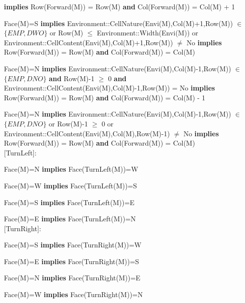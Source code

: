 \documentclass[11pt]{article}
\begin{document}
\textbf{implies} Row(Forward(M)) = Row(M) \textbf{and} Col(Forward(M)) = Col(M) + 1

Face(M)=S \textbf{implies}
Environment::CellNature(Envi(M),Col(M)+1,Row(M)) $\in$ $\{EMP, DWO\}$
or Row(M) $\leq$ Environment::Width(Envi(M))
or Environment::CellContent(Envi(M),Col(M)+1,Row(M)) $\neq$ No
\textbf{implies} Row(Forward(M)) = Row(M)
\textbf{and} Col(Forward(M)) = Col(M)

Face(M)=N \textbf{implies} Environment::CellNature(Envi(M),Col(M)-1,Row(M)) $\in$ $\{EMP, DNO\}$
\textbf{and} Row(M)-1 $\geq$ 0
\textbf{and} Environment::CellContent(Envi(M),Col(M)-1,Row(M)) = No
\textbf{implies} Row(Forward(M)) = Row(M)
\textbf{and} Col(Forward(M)) = Col(M) - 1

Face(M)=N \textbf{implies}
Environment::CellNature(Envi(M),Col(M)-1,Row(M)) $\in$
$\{EMP, DNO\}$
or Row(M)-1 $\geq$ 0
or Environment::CellContent(Envi(M),Col(M),Row(M)-1) $\neq$ No
\textbf{implies} Row(Forward(M)) = Row(M)
\textbf{and} Col(Forward(M)) = Col(M)\\

[TurnLeft]:

Face(M)=N \textbf{implies} Face(TurnLeft(M))=W

Face(M)=W \textbf{implies} Face(TurnLeft(M))=S

Face(M)=S \textbf{implies} Face(TurnLeft(M))=E

Face(M)=E \textbf{implies} Face(TurnLeft(M))=N\\

[TurnRight]:

Face(M)=S \textbf{implies} Face(TurnRight(M))=W

Face(M)=E \textbf{implies} Face(TurnRight(M))=S

Face(M)=N \textbf{implies} Face(TurnRight(M))=E

Face(M)=W \textbf{implies} Face(TurnRight(M))=N\\
\end{document}
